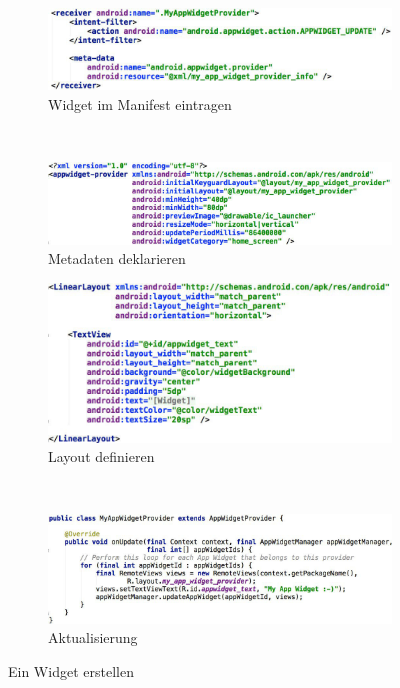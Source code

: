 \begin{figure}
	\centering
	\begin{subfigure}[b]{0.48\textwidth}
		\includegraphics[width=\textwidth]{fig/widget-manifest}
		\caption{Widget im Manifest eintragen}
	\end{subfigure}
	~
	\begin{subfigure}[b]{0.48\textwidth}
		\includegraphics[width=\textwidth]{fig/widget-info}
		\caption{Metadaten deklarieren}
	\end{subfigure}
	\begin{subfigure}[b]{0.48\textwidth}
		\includegraphics[width=\textwidth]{fig/widget-layout}
		\caption{Layout definieren}
	\end{subfigure}
	~
	\begin{subfigure}[b]{0.48\textwidth}
		\includegraphics[width=\textwidth]{fig/widget-klasse}
		\caption{Aktualisierung}
	\end{subfigure}
	\caption{Ein Widget erstellen}
	\label{fig:widget}
\end{figure}

